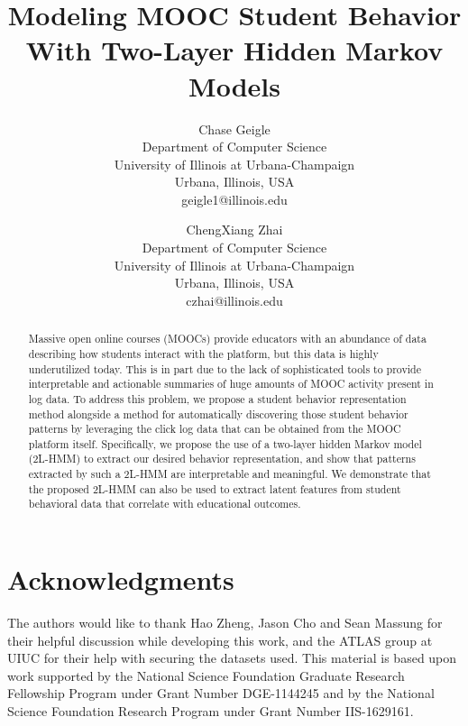 \documentclass[a4,notitlepage,12pt]{jedm}
\begin{document}
\title{Modeling MOOC Student Behavior With Two-Layer Hidden Markov Models}

\author{%
  {\large Chase Geigle}\\Department of Computer Science\\University
  of Illinois at Urbana-Champaign\\Urbana, Illinois,
  USA\\geigle1@illinois.edu
  \and
  {\large ChengXiang Zhai}\\Department of Computer Science\\University of
  Illinois at Urbana-Champaign\\Urbana, Illinois, USA\\czhai@illinois.edu}

\maketitle

\begin{abstract}
  Massive open online courses (MOOCs) provide educators with an abundance
  of data describing how students interact with the platform, but this data
  is highly underutilized today. This is in part due to the lack of
  sophisticated tools to provide interpretable and actionable summaries of
  huge amounts of MOOC activity present in log data. To address this problem, we
  propose a student behavior representation method alongside a method for
  automatically discovering those student behavior patterns by leveraging
  the click log data that can be obtained from the MOOC platform itself.
  Specifically, we propose the use of a two-layer hidden Markov model
  (2L-HMM) to extract our desired behavior representation, and show that
  patterns extracted by such a 2L-HMM are interpretable and meaningful.
  We demonstrate that the proposed 2L-HMM can also be used to extract latent features
  from student behavioral data that correlate with educational outcomes.
\end{abstract}

\newcommand{\NSFGRFP}{This material is based upon work supported by the
National Science Foundation Graduate Research Fellowship Program under
Grant Number DGE-1144245 and by the National Science Foundation Research Program under Grant Number IIS-1629161. }

\newcommand{\acknowledgments}{The authors would like to thank Hao Zheng,
Jason Cho and Sean Massung for their helpful discussion while developing
this work, and the ATLAS group at UIUC for their help with securing the
datasets used. \NSFGRFP{}}













\section{Acknowledgments}
\acknowledgments{}



\end{document}
